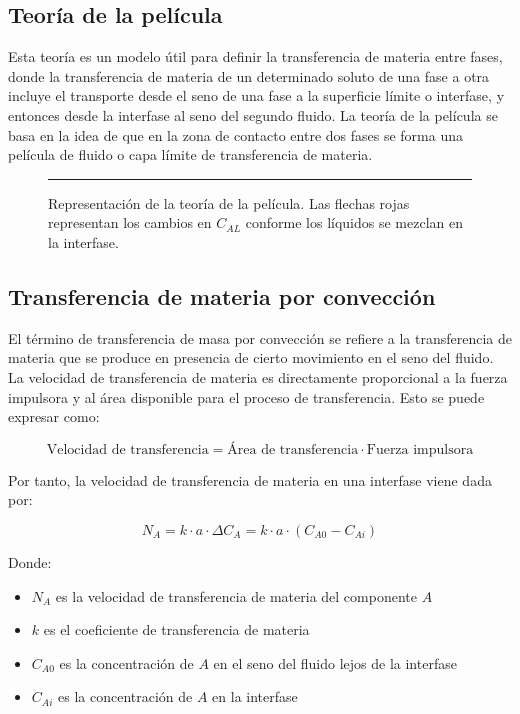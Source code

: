 \documentclass{AsignaturaResumen}
\begin{document}
\subsection{Teoría de la película}

Esta teoría es un modelo útil para definir la transferencia de materia entre fases, donde la transferencia de materia de un determinado soluto de una fase a otra incluye el transporte desde el seno de una fase a la superficie límite o interfase, y entonces desde la interfase al seno del segundo fluido. La teoría de la película se basa en la idea de que en la zona de contacto entre dos fases se forma una película de fluido o capa límite de transferencia de materia.

\begin{figure}\centering
    \resizebox{\linewidth}{!}{}
    \rule{\linewidth}{0.5pt}
    \caption{Representación de la teoría de la película. Las flechas rojas representan los cambios en $C_{AL}$ conforme los líquidos se mezclan en la interfase.}
    \label{fig:teoria_de_la_pelicula}
\end{figure}

\subsection{Transferencia de materia por convección}

El término de transferencia de masa por convección se refiere a la transferencia de materia que se produce en presencia 
de cierto movimiento en el seno del fluido. La velocidad de transferencia de materia es directamente proporcional a la fuerza impulsora y al área disponible para el proceso de transferencia. Esto se puede expresar como:

\begin{equation}
    \text{Velocidad de transferencia} = \text{Área de transferencia} \cdot \text{Fuerza impulsora}
\end{equation}

Por tanto, la velocidad de transferencia de materia en una interfase viene dada por:

\begin{equation}
    N_{A} = k \cdot a \cdot \Delta C_{A} = k \cdot a \cdot (C_{A0} - C_{Ai}) 
\end{equation}

Donde:

\begin{itemize}
    \item $N_{A}$ es la velocidad de transferencia de materia del componente $A$
    \item $k$ es el coeficiente de transferencia de materia
    \item $C_{A0}$ es la concentración de $A$ en el seno del fluido lejos de la interfase
    \item $C_{Ai}$ es la concentración de $A$ en la interfase
\end{itemize}
\end{document}
